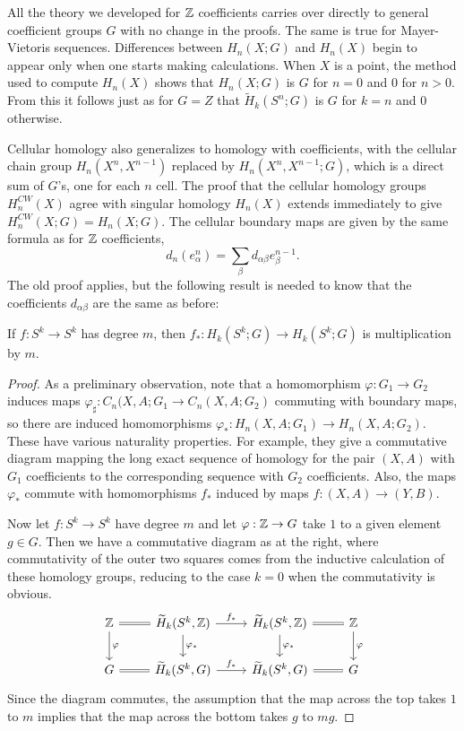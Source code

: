All the theory we developed for $\mathbb{Z}$ coefficients carries over directly to general coefficient groups $G$ with no change in the proofs. The same is true for Mayer-Vietoris sequences. Differences between $H_n(X;G)$ and $H_n(X)$ begin to appear only when one starts making calculations. When $X$ is a point, the method used to compute $H_n(X)$ shows that $H_n(X;G)$ is $G$ for $n=0$ and $0$ for $n>0$. From this it follows just as for $G=Z$ that $\widetilde{H}_k(S^n;G)$ is $G$ for $k=n$ and $0$ otherwise.\par
Cellular homology also generalizes to homology with coefficients, with the cellular chain group $H_n(X^n,X^{n-1})$ replaced by $H_n(X^n,X^{n-1};G)$, which is a direct sum of $G$'s, one for each $n$ cell. The proof that the cellular homology groups $H^{CW}_n(X)$ agree with singular homology $H_n(X)$ extends immediately to give $H^{CW}_n(X;G)=H_n(X;G)$. The cellular boundary maps are given by the same formula as for $\mathbb{Z}$ coefficients,
\[d_n(e^n_\alpha)=\sum_\beta d_{\alpha\beta}e^{n-1}_\beta.\]
The old proof applies, but the following result is needed to know that the coefficients $d_{\alpha\beta}$ are the same as before:
\begin{lemma}\label{degree with coefficient}
If $f:S^k\to S^k$ has degree $m$, then $f_*:H_k(S^k;G)\to H_k(S^k;G)$ is multiplication by $m$.
\end{lemma}
\begin{proof}
As a preliminary observation, note that a homomorphism $\varphi:G_1\to G_2$ induces maps $\varphi_\sharp:C_n(X,A;G_1\to C_n(X,A;G_2)$ commuting with boundary maps, so there are induced homomorphisms $\varphi_*:H_n(X,A;G_1)\to H_n(X,A;G_2)$. These have various naturality properties. For example, they give a commutative diagram mapping the long exact sequence of homology for the pair $(X,A)$ with $G_1$ coefficients to the corresponding sequence with $G_2$ coefficients. Also, the maps $\varphi_*$ commute with homomorphisms $f_*$ induced by maps $f:(X,A)\to (Y,B)$.\par
Now let $f:S^k\to S^k$ have degree $m$ and let $\varphi:\mathbb{Z}\to G$ take $1$ to a given element $g\in G$. Then we have a commutative diagram as at the right, where commutativity of the outer two squares comes from the inductive calculation of these homology groups, reducing to the case $k=0$ when the commutativity is obvious.
\[\begin{tikzcd}
\Z\ar[d,"\varphi"]\ar[r,equal]&\widetilde{H}_k(S^k,\Z)\ar[d,"\varphi_*"]\ar[r,"f_*"]&\widetilde{H}_k(S^k,\Z)\ar[r,equal]\ar[d,"\varphi_*"]&\Z\ar[d,"\varphi"]\\
G\ar[r,equal]&\widetilde{H}_k(S^k,G)\ar[r,"f_*"]&\widetilde{H}_k(S^k,G)\ar[r,equal]&G
\end{tikzcd}\]
Since the diagram commutes, the assumption that the map across the top takes
$1$ to $m$ implies that the map across the bottom takes $g$ to $mg$.
\end{proof}
